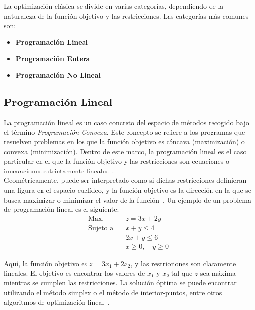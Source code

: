 La optimización clásica se divide en varias categorías, dependiendo de la naturaleza de la función
objetivo y las restricciones. Las categorías más comunes son:
\begin{itemize}
    \item \textbf{Programación Lineal}
    \item \textbf{Programación Entera}
    \item \textbf{Programación No Lineal}
\end{itemize}

\subsection{Programación Lineal}
La programación lineal es un caso concreto del espacio de métodos recogido bajo el término 
\textit{Programación Convexa}. Este concepto se refiere a los programas que resuelven problemas 
en los que la función objetivo es cóncava (maximización) o convexa (minimización). Dentro de este
marco, la programación lineal es el caso particular en el que la función objetivo y las restricciones
son ecuaciones o inecuaciones estrictamente lineales~\cite{wikipedia2025optimizacion}.\\

Geométricamente, puede ser interpretado como si dichas restricciones definieran una figura en el 
espacio euclídeo, y la función objetivo es la dirección en la que se busca maximizar o minimizar el 
valor de la función~\cite{funke2024discreteopt}. Un ejemplo de un problema de programación lineal 
es el siguiente:
\begin{align*}
    \text{Max.} \quad & z = 3x + 2y \\
    \text{Sujeto a} \quad & x + y \leq 4 \\
    & 2x + y \leq 6 \\
    & x \geq 0, \quad y \geq 0
\end{align*}

Aquí, la función objetivo es \(z = 3x_1 + 2x_2\), y las restricciones son claramente lineales. El
objetivo es encontrar los valores de \(x_1\) y \(x_2\) tal que \(z\) sea máxima mientras se cumplen 
las restricciones. La solución óptima se puede encontrar utilizando el método simplex o el método 
de interior-puntos, entre otros algoritmos de optimización lineal~\cite{wikipedia2025optimizacion}.


